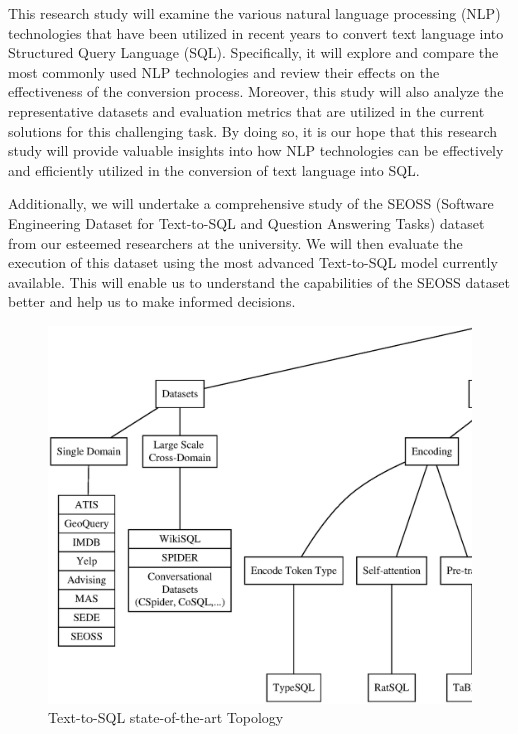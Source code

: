 This research study will examine the various natural language processing (NLP) technologies that have been utilized in recent years to convert text language into Structured Query Language (SQL). Specifically, it will explore and compare the most commonly used NLP technologies and review their effects on the effectiveness of the conversion process. Moreover, this study will also analyze the representative datasets and evaluation metrics that are utilized in the current solutions for this challenging task. By doing so, it is our hope that this research study will provide valuable insights into how NLP technologies can be effectively and efficiently utilized in the conversion of text language into SQL.

Additionally, we will undertake a comprehensive study of the SEOSS (Software Engineering Dataset for Text-to-SQL and Question Answering Tasks) dataset from our esteemed researchers at the university. We will then evaluate the execution of this dataset using the most advanced Text-to-SQL model currently available. This will enable us to understand the capabilities of the SEOSS dataset better and help us to make informed decisions.

\begin{figure}
    \centering
    \includegraphics[width=1\linewidth]{pics/mindmap/mind}
    \caption{Text-to-SQL state-of-the-art Topology}
    \label{fig:mindmap}
\end{figure}

